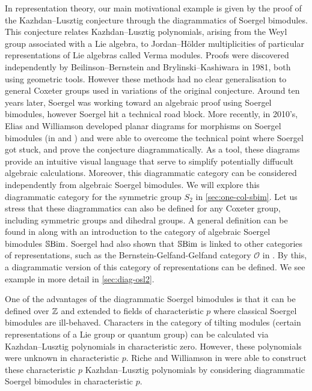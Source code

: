 In representation theory, our main motivational example is given by the proof of the Kazhdan--Lusztig conjecture through the diagrammatics of Soergel bimodules. This conjecture relates Kazhdan--Lusztig polynomials, arising from the Weyl group associated with a Lie algebra, to Jordan--H\"older multiplicities of particular representations of Lie algebras called Verma modules. Proofs were discovered independently by Beilinson--Bernstein and Brylinski--Kashiwara in 1981, both using geometric tools. However these methods had no clear generalisation to general Coxeter groups used in variations of the original conjecture. Around ten years later, Soergel was working toward an algebraic proof using Soergel bimodules, however Soergel hit a technical road block. More recently, in 2010's, Elias and Williamson developed planar diagrams for morphisms on Soergel bimodules (in \cite{hodge-theory-of-soergel-bimodules} and \cite{diagrammatics-for-soergel-categories}) and were able to overcome the technical point where Soergel got stuck, and prove the conjecture diagrammatically. As a tool, these diagrams provide an intuitive visual language that serve to simplify potentially diffucult algebraic calculations. Moreover, this diagrammatic category can be considered independently from algebraic Soergel bimodules. We will explore this diagrammatic category for the symmetric group $S_2$ in \autoref{sec:one-col-sbim}. Let us stress that these diagrammatics can also be defined for any Coxeter group, including symmetric groups and dihedral groups. A general definition can be found in \cite{intro-soergel-bimodules} along with an introduction to the category of algebraic Soergel bimodules $\operatorname{\mathbb{S}Bim}$. Soergel had also shown that $\operatorname{\mathbb{S}Bim}$ is linked to other categories of representations, such as the Bernstein-Gelfand-Gelfand category $\mathcal{O}$ in \cite{soergel-category-O}. By this, a diagrammatic version of this category of representations can be defined. We see example in more detail in \autoref{sec:diag-osl2}.

One of the advantages of the diagrammatic Soergel bimodules is that it can be defined over $\mathbb{Z}$ and extended to fields of characteristic $p$ where classical Soergel bimodules are ill-behaved. Characters in the category of tilting modules (certain representations of a Lie group or quantum group) can be calculated via Kazhdan--Lusztig polynomials in characteristic zero. However, these polynomials were unknown in characteristic $p$. Riche and Williamson in \cite{riche-williamson-tilt-modules-p-canon-basis} were able to construct these characteristic $p$ Kazhdan--Lusztig polynomials by considering diagrammatic Soergel bimodules in characteristic $p$.

